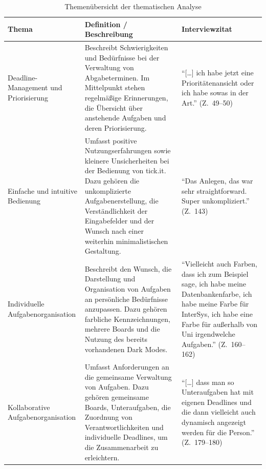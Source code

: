 \begin{table}[H]
    \centering
    \caption{Themenübersicht der thematischen Analyse}
    \label{tab:themen}
    \begin{tabularx}{\linewidth}{@{}>{\raggedright\arraybackslash}p{2.7cm} >{\raggedright\arraybackslash}X >{\raggedright\arraybackslash}p{4cm}@{}}
        \toprule
        Thema & Definition / Beschreibung & Interviewzitat \\
        \midrule
        Deadline-Management und Priorisierung
        & Beschreibt Schwierigkeiten und Bedürfnisse bei der Verwaltung von Abgabeterminen.
        Im Mittelpunkt stehen regelmäßige Erinnerungen, die Übersicht über anstehende Aufgaben und deren Priorisierung.
        & \enquote{[\dots] ich habe jetzt eine Prioritätenansicht oder ich habe sowas in der Art.} (Z.~49–50) \\
        \addlinespace
        Einfache und intuitive Bedienung
        & Umfasst positive Nutzungserfahrungen sowie kleinere Unsicherheiten bei der Bedienung von tick.it.
        Dazu gehören die unkomplizierte Aufgabenerstellung, die Verständlichkeit der Eingabefelder und der Wunsch nach einer weiterhin minimalistischen Gestaltung.
        & \enquote{Das Anlegen, das war sehr straightforward. Super unkompliziert.} (Z.~143) \\
        \addlinespace
        Individuelle Aufgabenorganisation
        & Beschreibt den Wunsch, die Darstellung und Organisation von Aufgaben an persönliche Bedürfnisse anzupassen.
        Dazu gehören farbliche Kennzeichnungen, mehrere Boards und die Nutzung des bereits vorhandenen Dark Modes.
        & \enquote{Vielleicht auch Farben, dass ich zum Beispiel sage, ich habe meine Datenbankenfarbe, ich habe meine Farbe für InterSys, ich habe eine Farbe für außerhalb von Uni irgendwelche Aufgaben.} (Z.~160–162) \\
        \addlinespace
        Kollaborative Aufgabenorganisation
        & Umfasst Anforderungen an die gemeinsame Verwaltung von Aufgaben.
        Dazu gehören gemeinsame Boards, Unteraufgaben, die Zuordnung von Verantwortlichkeiten und individuelle Deadlines, um die Zusammenarbeit zu erleichtern.
        & \enquote{[\dots] dass man so Unteraufgaben hat mit eigenen Deadlines und die dann vielleicht auch dynamisch angezeigt werden für die Person.} (Z.~179–180) \\
        \bottomrule
    \end{tabularx}
\end{table}

